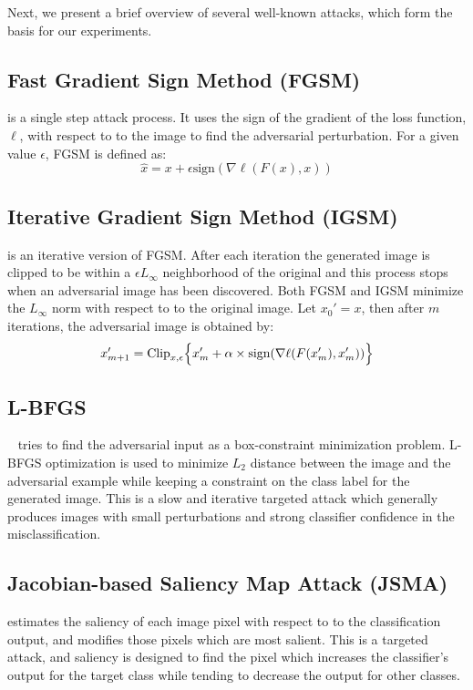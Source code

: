 Next, we present a brief overview of several well-known attacks, which form the basis for our experiments.

\subsection{Fast Gradient Sign Method (FGSM)}
\cite{Goodfellow2014ExplainingAH} is a single step attack process.
It uses the sign of the gradient of the loss function,  $\ell$,  with respect to to the image to find the adversarial perturbation. 
For a given value $\epsilon$, FGSM is defined as:
\begin{equation}
\hat{x} = x + \epsilon \text{sign} (\nabla \ell (F(x),x))
\end{equation}

\subsection{Iterative Gradient Sign Method (IGSM)} 
\cite{Kurakin2016AdversarialEI} is an iterative version of FGSM. After each iteration the generated image is clipped to be within a $\epsilon L_\infty$ neighborhood of the original and this process stops when an adversarial image has been discovered. 
Both FGSM and IGSM minimize the $L_\infty$ norm with respect to to the original image. Let $x_0' = x$, then after $m$ iterations, the adversarial image is obtained by:
\begin{equation}
x_{m+1}' = \text{Clip}_{x,\epsilon} \Bigl\{x_m' + \alpha \times \text{sign}(\nabla \ell (F(x'_m),x'_m))  \Bigr\} 
\end{equation}

\subsection{L-BFGS} ~\cite{Szegedy2013IntriguingPO} tries to find the adversarial input as a box-constraint minimization problem.
L-BFGS optimization is used to minimize $L_2$ distance between the image and the adversarial example while keeping a constraint on the class label for the generated image.
This is a slow and iterative targeted attack which generally produces images with small perturbations and strong classifier confidence in the misclassification.


\subsection{Jacobian-based Saliency Map Attack (JSMA)} 
\cite{papernot2016limitations} estimates the saliency of each image pixel with respect to to the classification output, and modifies those pixels which are most salient. This is a targeted attack, and saliency is designed to find the pixel which increases the classifier's output for the target class while tending to decrease the output for other classes.

